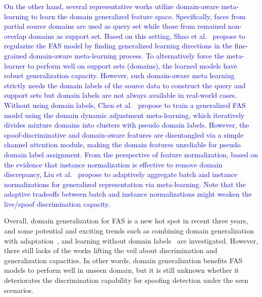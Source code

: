 \documentclass[10pt,journal,compsoc]{IEEEtran}
\begin{document}
\textcolor{blue}{On the other hand, several representative works utilize domain-aware meta-learning to learn the domain generalized feature space. Specifically, faces from partial source domains are used as query set while those from remained non-overlap domains as support set. Based on this setting, Shao et al.~\cite{shao2019regularized} propose to regularize the FAS model by finding generalized learning directions in the fine-grained domain-aware meta-learning process. To alternatively force the meta-learner to perform well on support sets (domains), the learned models have robust generalization capacity. However, such domain-aware meta learning strictly needs the domain labels of the source data to construct the query and support sets but domain labels are not always available in real-world cases. Without using domain labels, Chen et al.~\cite{chen2021generalized} propose to train a generalized FAS model using the domain dynamic adjustment meta-learning, which iteratively divides mixture domains into clusters with pseudo domain labels. However, the spoof-discriminative and domain-aware features are disentangled via a simple channel attention module, making the domain features unreliable for pseudo domain label assignment. From the perspective of feature normalization, based on the evidence that instance normalization is effective to remove domain discrepancy, Liu et al.~\cite{liu2021adaptive} propose to adaptively aggregate batch and instance normalizations for generalized representation via meta-learning. Note that the adaptive tradeoffs between batch and instance normalizations might weaken the live/spoof discrimination capacity.}


Overall, domain generalization for FAS is a new hot spot in recent three years, and some potential and exciting trends such as combining domain generalization with adaptation~\cite{wang2021self}, and learning without domain labels~\cite{chen2021generalized} are investigated. However, there still lacks of the works lifting the veil about discrimination and generalization capacities. In other words, domain generalization benefits FAS models to perform well in unseen domain, but it is still unknown whether it deteriorates the discrimination capability for spoofing detection under the seen scenarios.
\end{document}
